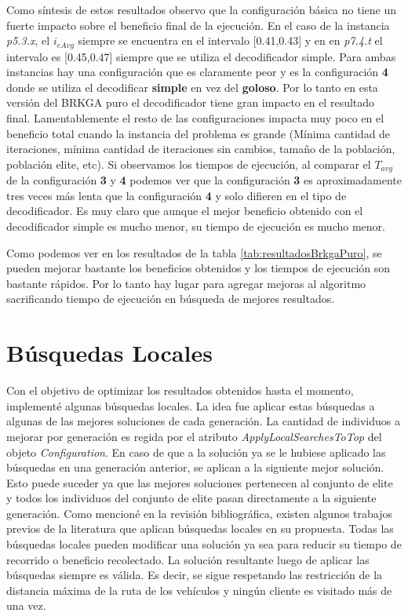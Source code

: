 \bigskip

Como síntesis de estos resultados observo que la configuración básica no tiene un fuerte impacto sobre el beneficio final de la ejecución. En el caso de la instancia \textit{p5.3.x}, el $i_{eAvg}$ siempre se encuentra en el intervalo [0.41,0.43] y en en \textit{p7.4.t} el intervalo es [0.45,0.47] siempre que se utiliza el decodificador simple. Para ambas instancias hay una configuración que es claramente peor y es la configuración \textbf{4} donde se utiliza el decodificar \textbf{simple} en vez del \textbf{goloso}. Por lo tanto en esta versión del BRKGA puro el decodificador tiene gran impacto en el resultado final. Lamentablemente el resto de las configuraciones impacta muy poco en el beneficio total cuando la instancia del problema es grande (Mínima cantidad de iteraciones, mínima cantidad de iteraciones sin cambios, tamaño de la población, población elite, etc). Si observamos los tiempos de ejecución, al comparar el $T_{avg}$ de la configuración \textbf{3} y \textbf{4} podemos ver que la configuración \textbf{3} es aproximadamente tres veces más lenta que la configuración \textbf{4} y solo difieren en el tipo de decodificador. Es muy claro que aunque el mejor beneficio obtenido con el decodificador simple es mucho menor, su tiempo de ejecución es mucho menor.

\bigskip

Como podemos ver en los resultados de la tabla \ref{tab:resultadosBrkgaPuro}, se pueden mejorar bastante los beneficios obtenidos y los tiempos de ejecución son bastante rápidos. Por lo tanto hay lugar para agregar mejoras al algoritmo sacrificando tiempo de ejecución en búsqueda de mejores resultados.

\bigskip

\section{Búsquedas Locales}

Con el objetivo de optimizar los resultados obtenidos hasta el momento, implementé algunas búsquedas locales. La idea fue aplicar estas búsquedas a algunas de las mejores soluciones de cada generación. La cantidad de individuos a mejorar por generación es regida por el atributo \textit{ApplyLocalSearchesToTop} del objeto \textit{Configuration}. En caso de que a la solución ya se le hubiese aplicado las búsquedas en una generación anterior, se aplican a la siguiente mejor solución. Esto puede suceder ya que las mejores soluciones pertenecen al conjunto de elite y todos los individuos del conjunto de elite pasan directamente a la siguiente generación. Como mencioné en la revisión bibliográfica, existen algunos trabajos previos de la literatura que aplican búsquedas locales en su propuesta. Todas las búsquedas locales pueden modificar una solución ya sea para reducir su tiempo de recorrido o beneficio recolectado. La solución resultante luego de aplicar las búsquedas siempre es válida. Es decir, se sigue respetando las restricción de la distancia máxima de la ruta de los vehículos y ningún cliente es visitado más de una vez. 

